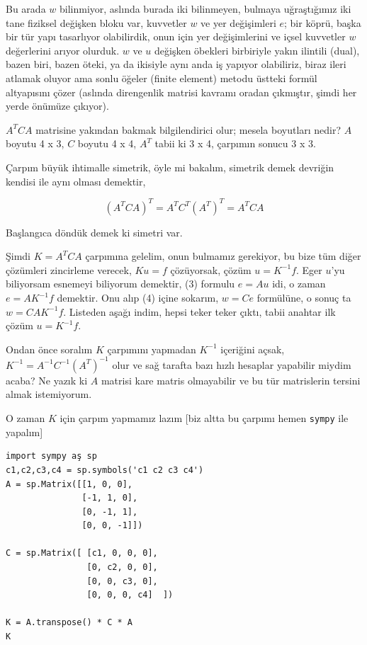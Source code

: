 \documentclass[12pt,fleqn]{article}\usepackage{../../common}
\begin{document}
Bu arada $w$ bilinmiyor, aslında burada iki bilinmeyen, bulmaya uğraştığımız iki
tane fiziksel değişken bloku var, kuvvetler $w$ ve yer değişimleri $e$; bir
köprü, başka bir tür yapı tasarlıyor olabilirdik, onun için yer değişimlerini ve
içsel kuvvetler $w$ değerlerini arıyor olurduk. $w$ ve $u$ değişken öbekleri
birbiriyle yakın ilintili (dual), bazen biri, bazen öteki, ya da ikisiyle aynı
anda iş yapıyor olabiliriz, biraz ileri atlamak oluyor ama sonlu öğeler (finite
element) metodu üstteki formül altyapısını çözer (aslında direngenlik matrisi
kavramı oradan çıkmıştır, şimdi her yerde önümüze çıkıyor).

$A^T C A$ matrisine yakından bakmak bilgilendirici olur; mesela boyutları nedir?
$A$ boyutu 4 x 3, $C$ boyutu 4 x 4, $A^T$ tabii ki 3 x 4, çarpımın sonucu 3 x 3.

Çarpım büyük ihtimalle simetrik, öyle mi bakalım, simetrik demek devriğin
kendisi ile aynı olması demektir, 

$$
(A^T C A)^T = A^T C^T (A^T)^T = A^T C A 
$$

Başlangıca döndük demek ki simetri var.

Şimdi $K = A^T C A$ çarpımına gelelim, onun bulmamız gerekiyor, bu bize tüm
diğer çözümleri zincirleme verecek, $K u = f$ çözüyorsak, çözüm $u = K^{-1}f$.
Eger $u$'yu biliyorsam esnemeyi biliyorum demektir, (3) formulu $e = A u$
idi, o zaman $e = A K^{-1} f$ demektir. Onu alıp (4) içine sokarım, $w = C e$
formülüne, o sonuç ta $w = C A K^{-1} f$. Listeden aşağı indim, hepsi teker
teker çıktı, tabii anahtar ilk çözüm $u = K^{-1} f$.

Ondan önce soralım $K$ çarpımını yapmadan $K^{-1}$ içeriğini açsak,
$K^{-1} = A^{-1}C^{-1} (A^T)^{-1}$ olur ve sağ tarafta bazı hızlı hesaplar
yapabilir miydim acaba? Ne yazık ki $A$ matrisi kare matris olmayabilir ve
bu tür matrislerin tersini almak istemiyorum. 

O zaman $K$ için çarpım yapmamız lazım [biz altta bu çarpımı hemen
\verb!sympy! ile yapalım]
  
\begin{verbatim}
import sympy aş sp
c1,c2,c3,c4 = sp.symbols('c1 c2 c3 c4')
A = sp.Matrix([[1, 0, 0],
               [-1, 1, 0],
               [0, -1, 1],
               [0, 0, -1]])

C = sp.Matrix([ [c1, 0, 0, 0],
                [0, c2, 0, 0],
                [0, 0, c3, 0],
                [0, 0, 0, c4]  ])

K = A.transpose() * C * A
K
\end{verbatim}
\end{document}
